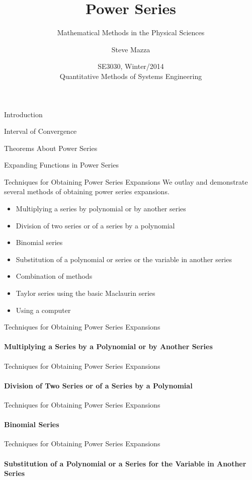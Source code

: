 \documentclass{beamer}
\title{Power Series}
\subtitle{Mathematical Methods in the Physical Sciences}
\author{Steve Mazza}
\institute[Naval Postgraduate School]
{
  Naval Postgraduate School \\
  Monterey, CA
}
\date {SE3030, Winter/2014 \\ Quantitative Methods of Systems Engineering}
\begin{document}
\frame{\titlepage}

\begin{frame}{Introduction}
\end{frame}

\begin{frame}{Interval of Convergence}
\end{frame}
  
\begin{frame}{Theorems About Power Series}
\end{frame}
  
\begin{frame}{Expanding Functions in Power Series}
\end{frame}
  
\begin{frame}{Techniques for Obtaining Power Series Expansions}
    We outlay and demonstrate several methods of obtaining power series expansions.
    \begin{itemize}
    	\item Multiplying a series by polynomial or by another series
	\item Division of two series or of a series by a polynomial
	\item Binomial series
	\item Substitution of a polynomial or series or the variable in another series
	\item Combination of methods
	\item Taylor series using the basic Maclaurin series
	\item Using a computer
    \end{itemize}
\end{frame}
  
\begin{frame}{Techniques for Obtaining Power Series Expansions}
    \framesubtitle{Multiplying a Series by a Polynomial or by Another Series}
\end{frame}
  
\begin{frame}{Techniques for Obtaining Power Series Expansions}
    \framesubtitle{Division of Two Series or of a Series by a Polynomial}
\end{frame}
  
\begin{frame}{Techniques for Obtaining Power Series Expansions}
    \framesubtitle{Binomial Series}
\end{frame}
  
\begin{frame}{Techniques for Obtaining Power Series Expansions}
    \framesubtitle{Substitution of a Polynomial or a Series for the Variable in Another Series}
\end{frame}
  
\end{document}
